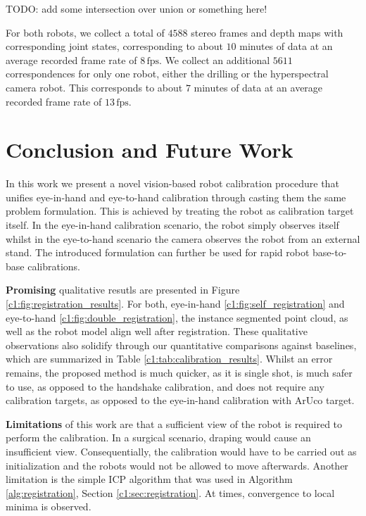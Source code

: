 TODO: add some intersection over union or something here!

For both robots, we collect a total of $4588$ stereo frames and depth maps with corresponding joint states, corresponding to about $10$ minutes of data at an average recorded frame rate of $8\,\text{fps}$. We collect an additional $5611$ correspondences for only one robot, either the drilling or the hyperspectral camera robot. This corresponds to about $7$ minutes of data at an average recorded frame rate of $13\,\text{fps}$.

\section{Conclusion and Future Work}%
In this work we present a novel vision-based robot calibration procedure that unifies eye-in-hand and eye-to-hand calibration through casting them the same problem formulation. This is achieved by treating the robot as calibration target itself. In the eye-in-hand calibration scenario, the robot simply observes itself whilst in the eye-to-hand scenario the camera observes the robot from an external stand. The introduced formulation can further be used for rapid robot base-to-base calibrations.

\textbf{Promising} qualitative resutls are presented in Figure \ref{c1:fig:registration_results}. For both, eye-in-hand \ref{c1:fig:self_registration} and eye-to-hand \ref{c1:fig:double_registration}, the instance segmented point cloud, as well as the robot model align well after registration. These qualitative observations also solidify through our quantitative comparisons against baselines, which are summarized in Table \ref{c1:tab:calibration_results}. Whilst an error remains, the proposed method is much quicker, as it is single shot, is much safer to use, as opposed to the handshake calibration, and does not require any calibration targets, as opposed to the eye-in-hand calibration with ArUco target.

\textbf{Limitations} of this work are that a sufficient view of the robot is required to perform the calibration. In a surgical scenario, draping would cause an insufficient view. Consequentially, the calibration would have to be carried out as initialization and the robots would not be allowed to move afterwards. Another limitation is the simple ICP algorithm that was used in Algorithm \ref{alg:registration}, Section \ref{c1:sec:registration}. At times, convergence to local minima is observed.

